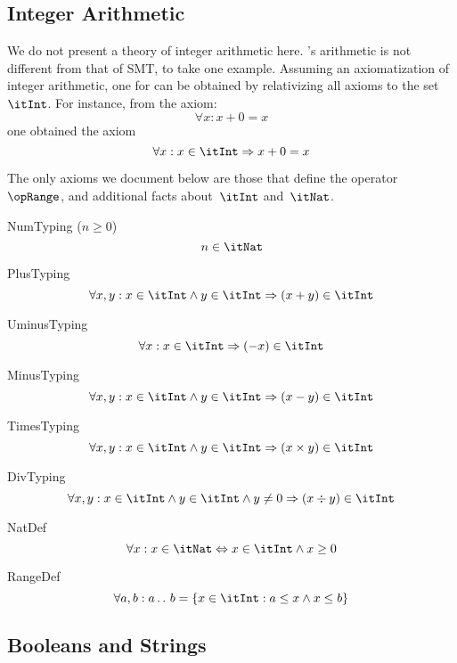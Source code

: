 \documentclass[11pt, a4paper, oneside]{article}
\begin{document}
    \subsection{Integer Arithmetic}
    \label{subsec:ints}

We do not present a theory of integer arithmetic here.  \TLA's arithmetic is not different from that of SMT, to take one example.  Assuming an axiomatization of integer arithmetic, one for \TLA can be obtained by relativizing all axioms to the set~$\itInt$.  For instance, from the axiom: \[
    \forall x : x + 0 = x
\] one obtained the \TLA axiom \[
    \forall x : x \in \itInt \imp x + 0 = x
\]

The only axioms we document below are those that define the operator~$\opRange$, and additional facts about~$\itInt$ and~$\itNat$.

\begin{axioms}
\item[NumTyping ($n \ge 0$)] \[
        n \in \itNat
    \]

\item[PlusTyping] \[
        \forall x, y : x \in \itInt \wedge y \in \itInt \imp (x + y) \in \itInt
    \]

\item[UminusTyping] \[
        \forall x : x \in \itInt \imp (- x) \in \itInt
    \]

\item[MinusTyping] \[
        \forall x, y : x \in \itInt \wedge y \in \itInt \imp (x - y) \in \itInt
    \]

\item[TimesTyping] \[
        \forall x, y : x \in \itInt \wedge y \in \itInt \imp (x \times y) \in \itInt
    \]

\item[DivTyping] \[
        \forall x, y : x \in \itInt \wedge y \in \itInt \wedge y \neq 0 \imp (x \div y) \in \itInt
    \]

\item[NatDef] \[
        \forall x : x \in \itNat \eqv x \in \itInt \wedge x \ge 0
    \]

\item[RangeDef] \[
        \forall a, b : a \ltwodots b = \st{ x \in \itInt : a \le x \wedge x \le b }
    \]

\end{axioms}


    \subsection{Booleans and Strings}
    \label{subsec:bools_and_strings}
\end{document}
